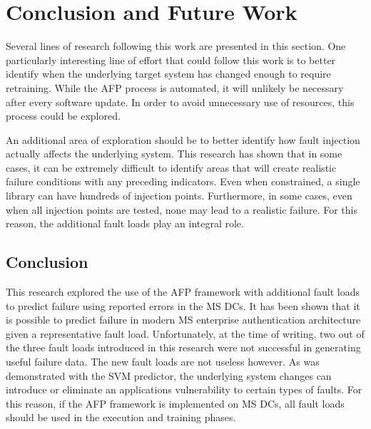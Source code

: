 \section{Conclusion and Future Work} \label{chapter5}
Several lines of research following this work are presented in this section.
One particularly interesting line of effort that could follow this work is to
better identify when the underlying target system has changed enough to require
retraining.  While the \ac{AFP} process is automated, it will unlikely be
necessary after every software update.  In order to avoid unnecessary use of
resources, this process could be explored.

An additional area of exploration should be to better identify how fault
injection actually affects the underlying system.  This research has shown that
in some cases, it can be extremely difficult to identify areas that will create
realistic failure conditions with any preceding indicators.  Even when
constrained, a single library can have hundreds of injection points.
Furthermore, in some cases, even when all injection points are tested, none may
lead to a realistic failure.  For this reason, the additional fault loads play
an integral role.

\subsection{Conclusion}
This research explored the use of the \ac{AFP} framework with additional fault
loads to predict failure using reported errors in the \ac{MS} \ac{DC}s.  It has
been shown that it is possible to predict failure in modern \ac{MS} enterprise
authentication architecture given a representative fault load.  Unfortunately,
at the time of writing, two out of the three fault loads introduced in this
research were not successful in generating useful failure data.  The new fault
loads are not useless however.  As was demonstrated with the \ac{SVM}
predictor, the underlying system changes can introduce or eliminate an
applications vulnerability to certain types of faults.  For this reason, if the
\ac{AFP} framework is implemented on \ac{MS} \ac{DC}s, all fault loads should
be used in the execution and training phases.


